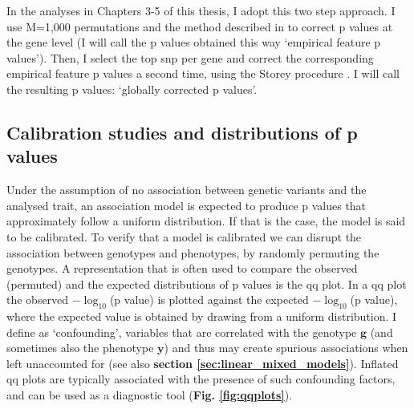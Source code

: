 In the analyses in Chapters 3-5 of this thesis, I adopt this two step approach.
I use M=1,000 permutations and the method described in \cite{ongen2016fast} to correct p values at the gene level (I will call the p values obtained this way `empirical feature p values').
Then, I select the top \gls{snp} per gene and correct the corresponding empirical feature p values a second time, using the Storey procedure \cite{storey2002direct}.
I will call the resulting p values: `globally corrected p values'.

\subsection{Calibration studies and distributions of p values}

Under the assumption of no association between genetic variants and the analysed trait, an association model is expected to produce p values that approximately follow a uniform distribution.
If that is the case, the model is said to be calibrated.
To verify that a model is calibrated we can disrupt the association between genotypes and phenotypes, by randomly permuting the genotypes. 
A representation that is often used to compare the observed (permuted) and the expected distributions of p values is the \gls{qq} plot. 
In a \gls{qq} plot the observed $-\log_{10}$(p value) is plotted against the expected $-\log_{10}$(p value), where the expected value is obtained by drawing from a uniform distribution. 
I define as `confounding', variables that are correlated with the genotype $\mathbf{g}$ (and sometimes also the phenotype $\mathbf{y}$) and thus may create spurious associations when left unaccounted for (see also \textbf{section \ref{sec:linear_mixed_models}}).
Inflated \gls{qq} plots are typically associated with the presence of such confounding factors, and can be used as a diagnostic tool (\textbf{Fig. \ref{fig:qqplots}}). 


